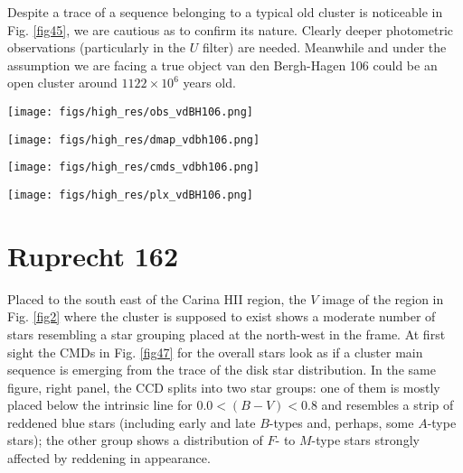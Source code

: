 \documentclass{aa}
\begin{document}
Despite a trace of a sequence belonging to a typical old cluster is
noticeable in Fig. \ref{fig45}, we are cautious as to confirm its nature.
Clearly deeper photometric observations (particularly in the $U$ filter) are
needed. Meanwhile and under the assumption we are facing a true object van
den Bergh-Hagen 106 could be an open cluster around $1122\times10^6$ years
old.

\begin{figure*}[ht]
    \centering
    \texttt{[image: figs/high\_res/obs\_vdBH106.png]}
    \caption{Idem Fig. \ref{fig3} for vdBH 106.}
    \label{fig43}
\end{figure*}
\begin{figure*}[ht]
    \centering
    \texttt{[image: figs/high\_res/dmap\_vdbh106.png]}
    \caption{Idem Fig. \ref{fig4} for vdBH 106.}
    \label{fig44}
\end{figure*}
\begin{figure*}[ht]
    \centering
    \texttt{[image: figs/high\_res/cmds\_vdbh106.png]}
    \caption{Idem Fig. \ref{fig5} for vdBH 106.}
    \label{fig45}
\end{figure*}
\begin{figure*}[ht]
    \centering
    \texttt{[image: figs/high\_res/plx\_vdBH106.png]}
    \caption{Idem Fig. \ref{fig6} for vdBH 106.}
    \label{fig46}
\end{figure*}



\section{Ruprecht 162}
\label{app:rup162}

Placed to the south east of the Carina HII region, the $V$ image of the region
in Fig. \ref{fig2} where the cluster is supposed to exist shows a moderate
number of stars resembling a star grouping placed at the north-west in the
frame. At first sight the CMDs in Fig. \ref{fig47} for the overall stars look
as if a cluster main sequence is emerging from the trace of the disk star
distribution.
In the same figure, right panel, the CCD splits into two star groups: one of
them is mostly placed below the intrinsic line for $0.0<(B-V)< 0.8$ and
resembles a strip of reddened blue stars (including early and late $B$-types
and, perhaps, some $A$-type stars); the other group shows a distribution of $F$-
to $M$-type stars strongly affected by reddening in appearance.\\
\end{document}
